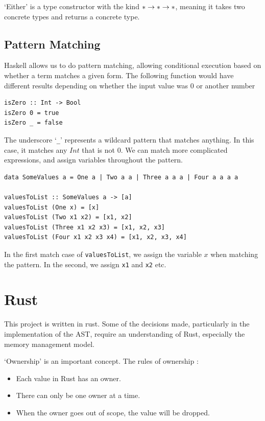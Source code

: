 `Either' is a type constructor with the kind $* \rightarrow * \rightarrow *$, meaning it takes two concrete types and returns a concrete type. 

\subsection{Pattern Matching}
\label{bg:haskell_pattern_match}
Haskell allows us to do pattern matching, allowing conditional execution based on whether a term matches a given form. The following function would have different results depending on whether the input value was 0 or another number

\begin{lstlisting}[language=SFL]
isZero :: Int -> Bool
isZero 0 = true
isZero _ = false
\end{lstlisting}

\noindent The underscore `\verb|_|' represents a wildcard pattern that matches anything. In this case, it matches any $Int$ that is not $0$. We can match more complicated expressions, and assign variables throughout the pattern.

\begin{lstlisting}[language=SFL]
data SomeValues a = One a | Two a a | Three a a a | Four a a a a

valuesToList :: SomeValues a -> [a]
valuesToList (One x) = [x]
valuesToList (Two x1 x2) = [x1, x2]
valuesToList (Three x1 x2 x3) = [x1, x2, x3]
valuesToList (Four x1 x2 x3 x4) = [x1, x2, x3, x4]
\end{lstlisting}

\noindent In the first match case of \verb|valuesToList|, we assign the variable $x$ when matching the pattern. In the second, we assign \verb|x1| and \verb|x2| etc. 

\section{Rust}
\label{bg:rust}

This project is written in rust.  Some of the decisions made, particularly in the implementation of the AST, require an understanding of Rust, especially the memory management model.

`Ownership' is an important concept. The rules of ownership \cite{rust_book}:
\begin{itemize}
    \item Each value in Rust has an owner.
    \item There can only be one owner at a time.
    \item When the owner goes out of scope, the value will be dropped.
\end{itemize}   

